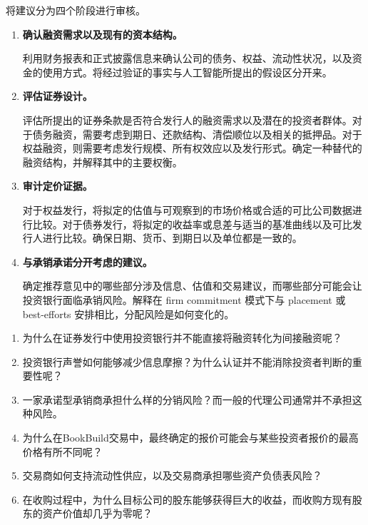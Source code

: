 将建议分为四个阶段进行审核。

\begin{enumerate}

\item \textbf{确认融资需求以及现有的资本结构。}

利用财务报表和正式披露信息来确认公司的债务、权益、流动性状况，以及资金的使用方式。将经过验证的事实与人工智能所提出的假设区分开来。

\item \textbf{评估证券设计。}

评估所提出的证券条款是否符合发行人的融资需求以及潜在的投资者群体。对于债务融资，需要考虑到期日、还款结构、清偿顺位以及相关的抵押品。对于权益融资，则需要考虑发行规模、所有权效应以及发行形式。确定一种替代的融资结构，并解释其中的主要权衡。

\item \textbf{审计定价证据。}

对于权益发行，将拟定的估值与可观察到的市场价格或合适的可比公司数据进行比较。对于债券发行，将拟定的收益率或息差与适当的基准曲线以及可比发行人进行比较。确保日期、货币、到期日以及单位都是一致的。

\item \textbf{与承销承诺分开考虑的建议。}

确定推荐意见中的哪些部分涉及信息、估值和交易建议，而哪些部分可能会让投资银行面临承销风险。解释在 firm commitment 模式下与 placement 或 best-efforts 安排相比，分配风险是如何变化的。

\end{enumerate}


\begin{enumerate}

\item 为什么在证券发行中使用投资银行并不能直接将融资转化为间接融资呢？

\item 投资银行声誉如何能够减少信息摩擦？为什么认证并不能消除投资者判断的重要性呢？

\item 一家承诺型承销商承担什么样的分销风险？而一般的代理公司通常并不承担这种风险。

\item 为什么在BookBuild交易中，最终确定的报价可能会与某些投资者报价的最高价格有所不同呢？

\item 交易商如何支持流动性供应，以及交易商承担哪些资产负债表风险？

\item 在收购过程中，为什么目标公司的股东能够获得巨大的收益，而收购方现有股东的资产价值却几乎为零呢？

\end{enumerate}

